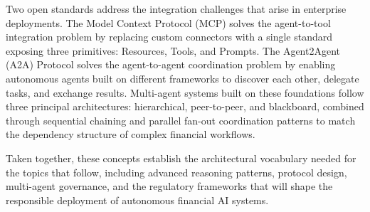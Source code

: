 \documentclass{article}
\begin{document}
Two open standards address the integration challenges that arise in enterprise deployments. The Model Context Protocol (MCP) solves the agent-to-tool integration problem by replacing custom connectors with a single standard exposing three primitives: Resources, Tools, and Prompts. The Agent2Agent (A2A) Protocol solves the agent-to-agent coordination problem by enabling autonomous agents built on different frameworks to discover each other, delegate tasks, and exchange results. Multi-agent systems built on these foundations follow three principal architectures: hierarchical, peer-to-peer, and blackboard, combined through sequential chaining and parallel fan-out coordination patterns to match the dependency structure of complex financial workflows.

Taken together, these concepts establish the architectural vocabulary needed for the topics that follow, including advanced reasoning patterns, protocol design, multi-agent governance, and the regulatory frameworks that will shape the responsible deployment of autonomous financial AI systems.

\printbibliography
\end{document}
